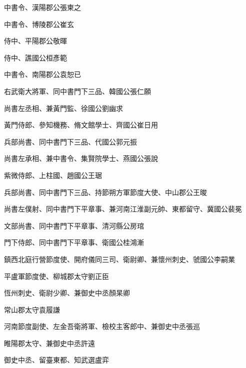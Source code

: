 \begin{pinyinscope}
 中書令、漢陽郡公張柬之



 中書令、博陵郡公崔玄



 侍中、平陽郡公敬暉



 侍中、譙國公桓彥範



 中書令、南陽郡公袁恕已



 右武衛大將軍、同中書門下三品、韓國公張仁願



 尚書左丞相、兼黃門監、徐國公劉幽求



 黃門侍郎、參知機務、脩文館學士、齊國公崔日用



 兵部尚書、同中書門下三品、代國公郭元振



 尚書左承相、兼中書令、集賢院學士、燕國公張說



 紫微侍郎、上柱國、趙國公王琚



 兵部尚書、同中書門下三品、持節朔方軍節度大使、中山郡公王晙



 尚書左僕射、同中書門下平章事、兼河南江淮副元帥、東都留守、冀國公裴冕



 文部尚書、同中書門下平章事、清河縣公房琯



 門下侍郎、同中書門下平章事、衛國公桂鴻漸



 鎮西北庭行營節度使、開府儀同三司、衛尉卿、兼懷州刺史、虢國公李嗣業



 平盧軍節度使、柳城郡太守劉正臣



 恆州刺史、衛尉少卿、兼御史中丞顏杲卿



 常山郡太守袁履謙



 河南節度副使、左金吾衛將軍、檢校主客郎中、兼御史中丞張巡



 睢陽郡太守、兼御史中丞許遠



 御史中丞、留臺東都、知武選盧弈




\end{pinyinscope}
